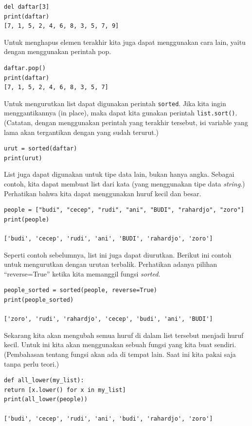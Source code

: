 \begin{verbatim}
del daftar[3]
print(daftar)
[7, 1, 5, 2, 4, 6, 8, 3, 5, 7, 9]
\end{verbatim}

Untuk menghapus elemen terakhir kita juga dapat menggunakan cara lain,
yaitu dengan menggunakan perintah pop.

\begin{verbatim}
daftar.pop()
print(daftar)
[7, 1, 5, 2, 4, 6, 8, 3, 5, 7]
\end{verbatim}

Untuk mengurutkan list dapat digunakan perintah {\tt sorted}.
Jika kita ingin menggantikannya (in place), maka dapat kita gunakan
perintah {\tt list.sort()}. (Catatan, dengan menggunakan perintah yang
terakhir tersebut, isi variable yang lama akan tergantikan dengan
yang sudah terurut.)
\begin{verbatim}
urut = sorted(daftar)
print(urut)
\end{verbatim}

List juga dapat digunakan untuk tipe data lain, bukan hanya angka.
Sebagai contoh, kita dapat membuat list dari kata (yang menggunakan
tipe data {\em string}.) Perhatikan bahwa kita dapat menggunakan
huruf kecil dan besar.

\begin{verbatim}
people = ["budi", "cecep", "rudi", "ani", "BUDI", "rahardjo", "zoro"]
print(people)

['budi', 'cecep', 'rudi', 'ani', 'BUDI', 'rahardjo', 'zoro']
\end{verbatim}

Seperti contoh sebelumnya, list ini juga dapat diurutkan. Berikut ini
contoh untuk mengurutkan dengan urutan terbalik. Perhatikan adanya
pilihan ``reverse=True'' ketika kita memanggil fungsi {\em sorted}.

\begin{verbatim}
people_sorted = sorted(people, reverse=True)
print(people_sorted)

['zoro', 'rudi', 'rahardjo', 'cecep', 'budi', 'ani', 'BUDI']
\end{verbatim}

Sekarang kita akan mengubah semua huruf di dalam list tersebut
menjadi huruf kecil. Untuk ini kita akan menggunakan sebuah fungsi
yang kita buat sendiri. (Pembahasan tentang fungsi akan ada di
tempat lain. Saat ini kita pakai saja tanpa perlu teori.)

\begin{verbatim}
def all_lower(my_list):
return [x.lower() for x in my_list]
print(all_lower(people))

['budi', 'cecep', 'rudi', 'ani', 'budi', 'rahardjo', 'zoro']
\end{verbatim}


